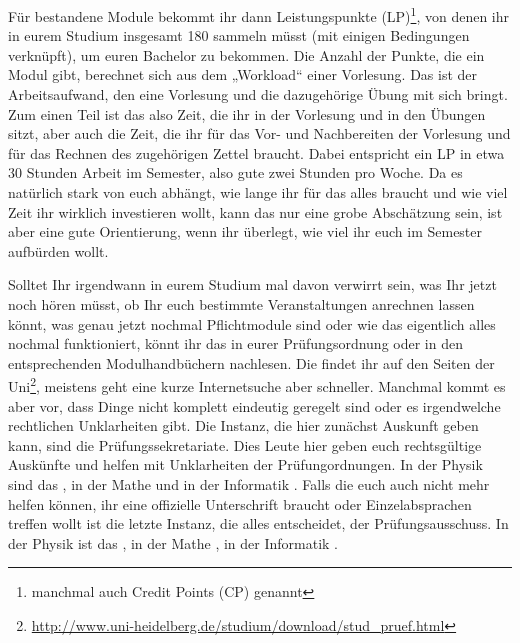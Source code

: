 Für bestandene Module bekommt ihr dann Leistungspunkte (LP)\footnote{manchmal
auch Credit Points (CP) genannt}, von denen ihr in eurem Studium insgesamt 180
sammeln müsst (mit einigen Bedingungen verknüpft), um euren Bachelor zu
bekommen. Die Anzahl der Punkte, die ein Modul gibt, berechnet sich aus dem
„Workload“ einer Vorlesung. Das ist der Arbeitsaufwand, den eine Vorlesung und
die dazugehörige Übung mit sich bringt. Zum einen Teil ist das also Zeit, die
ihr in der Vorlesung und in den Übungen sitzt, aber auch die Zeit, die ihr für
das Vor- und Nachbereiten der Vorlesung und für das Rechnen des zugehörigen
Zettel braucht. Dabei entspricht ein LP in etwa 30 Stunden Arbeit im Semester,
also gute zwei Stunden pro Woche. Da es natürlich stark von euch abhängt, wie
lange ihr für das alles braucht und wie viel Zeit ihr wirklich investieren
wollt, kann das nur eine grobe Abschätzung sein, ist aber eine gute
Orientierung, wenn ihr überlegt, wie viel ihr euch im Semester aufbürden wollt.

Solltet Ihr irgendwann in eurem Studium mal davon verwirrt sein, was Ihr jetzt
noch hören müsst, ob Ihr euch bestimmte Veranstaltungen anrechnen lassen könnt,
was genau jetzt nochmal Pflichtmodule sind oder wie das eigentlich alles
nochmal funktioniert, könnt ihr das in eurer Prüfungsordnung oder in den
entsprechenden Modulhandbüchern nachlesen. Die findet ihr auf den Seiten der
Uni\footnote{\url{http://www.uni-heidelberg.de/studium/download/stud_pruef.html}},
meistens geht eine kurze Internetsuche aber schneller. Manchmal kommt es aber
vor, dass Dinge nicht komplett eindeutig geregelt sind oder es irgendwelche
rechtlichen Unklarheiten gibt. Die Instanz, die hier zunächst Auskunft geben
kann, sind die Prüfungssekretariate. Dies Leute hier geben euch rechtsgültige
Auskünfte und helfen mit Unklarheiten der Prüfungordnungen. In der Physik sind
das \pruefsekphysik, in der Mathe \pruefsekmathe und in der
Informatik \pruefsekinfo. Falls die euch auch nicht mehr helfen können, ihr
eine offizielle Unterschrift braucht oder Einzelabsprachen treffen wollt ist
die letzte Instanz, die alles entscheidet, der Prüfungsausschuss. In der Physik
ist das \pruefausschussvorsitzphysik, in der Mathe \pruefausschussvorsitzmathe,
in der Informatik \pruefausschussvorsitzinformatik.

